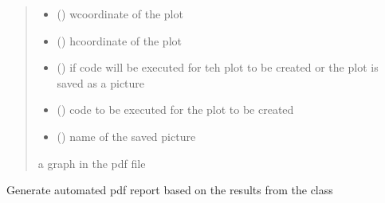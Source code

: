 \documentclass[letterpaper,10pt,english]{sphinxmanual}
\begin{document}
\begin{fulllineitems}
\begin{fulllineitems}
\begin{quote}
\begin{description}
\begin{itemize}
\item {} 
\sphinxAtStartPar
{} () \textendash{} w\sphinxhyphen{}coordinate of the plot

\item {} 
\sphinxAtStartPar
{} () \textendash{} h\sphinxhyphen{}coordinate of the plot

\item {} 
\sphinxAtStartPar
{} () \textendash{} if code will be executed for teh plot to be created or the plot is saved as a picture

\item {} 
\sphinxAtStartPar
{} () \textendash{} code to be executed for the plot to be created

\item {} 
\sphinxAtStartPar
{} () \textendash{} name of the saved picture

\end{itemize}

\sphinxAtStartPar
a graph in the pdf file

\end{description}\end{quote}

\end{fulllineitems}


\begin{fulllineitems}
\label{\detokenize{BeeLitReview:BeeLitReview.BeeLitReview.pdf_report_generate}}
\pysigstartsignatures
{}
\pysigstopsignatures
\sphinxAtStartPar
Generate automated pdf report based on the results from the class


\end{fulllineitems}
\end{fulllineitems}
\end{document}
